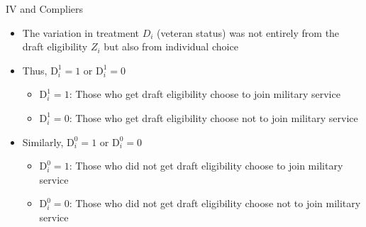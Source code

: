 \documentclass[dvipsnames,hyperref={pdfpagelabels=false}]{beamer}
\begin{document}
\begin{frame}{IV and Compliers}
	\begin{itemize}
		\item The variation in treatment $D_{i}$ (veteran status) was not entirely from the draft eligibility $Z_{i}$ but also from individual choice
		\vspace{0.2cm}
		\item Thus, $\mathrm{D}^{1}_{i} = 1$ or $\mathrm{D}^{1}_{i}=0$
		\vspace{0.2cm}
		\begin{itemize}
			\item $\mathrm{D}^{1}_{i} = 1$: Those who get draft eligibility choose to join military service  
			\vspace{0.2cm}
			\item $\mathrm{D}^{1}_{i}=0$: Those who get draft eligibility choose not to join military service
		\end{itemize}
		\vspace{0.2cm}
		\item Similarly, $\mathrm{D}^{0}_{i} = 1$ or $\mathrm{D}^{0}_{i}=0$
		\vspace{0.2cm}
		\begin{itemize}
			\item $\mathrm{D}^{0}_{i} = 1$: Those who did not get draft eligibility choose to join military service
			\vspace{0.2cm}
			\item $\mathrm{D}^{0}_{i}=0$: Those who did not get draft eligibility choose not to join military service
		\end{itemize}
		
	\end{itemize}
\end{frame}
\end{document}
